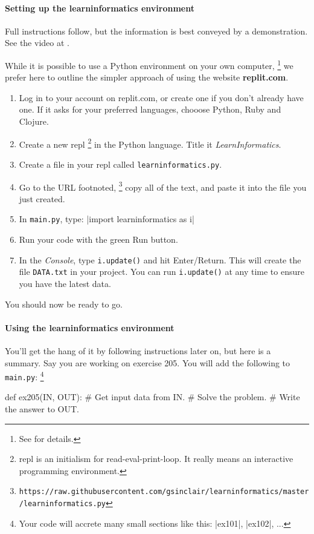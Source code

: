 \paragraph{Setting up the learninformatics environment} Full instructions follow, but the
information is best conveyed by a demonstration. See the video at .

While it is possible to use a Python environment on your own computer,%
\footnote{See  for details.}
we prefer here to outline the simpler approach of using the website \textbf{replit.com}.

\begin{enumerate}
  \item Log in to your account on replit.com, or create one if you don't already have one.
    If it asks for your preferred languages, chooose Python, Ruby and Clojure.
  \item Create a new repl%
\footnote{repl is an initialism for read-eval-print-loop. It really means an interactive
  programming environment.}
    in the Python language. Title it \emph{LearnInformatics}.
  \item Create a file in your repl called \texttt{learninformatics.py}.
  \item Go to the URL footnoted,%
\footnote{\texttt{https://raw.githubusercontent.com/gsinclair/learninformatics/master/learninformatics.py}}
    copy all of the text, and paste it into the file you just created.
  \item In \texttt{main.py}, type: \pycode|import learninformatics as i|
  \item Run your code with the green Run button.
  \item In the \emph{Console}, type \texttt{i.update()} and hit Enter/Return. This will
    create the file \texttt{DATA.txt} in your project. You can run \texttt{i.update()} at
    any time to ensure you have the latest data.
\end{enumerate}

You should now be ready to go.

\paragraph{Using the learninformatics environment} You'll get the hang of it by following
instructions later on, but here is a summary. Say you are working on exercise 205. You
will add the following to \texttt{main.py}:%
\footnote{Your code will accrete many small sections like this: \pycode|ex101|,
  \pycode|ex102|, ...}
\begin{pythoncode}
  def ex205(IN, OUT):
    # Get input data from IN.
    # Solve the problem.
    # Write the answer to OUT.
\end{pythoncode}


